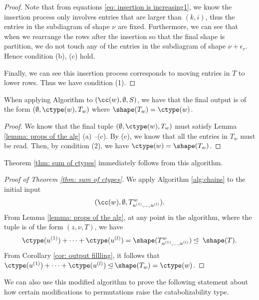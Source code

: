 \begin{proof}
   Note that from equations \eqref{eq: insertion is increasing1}, we know the insertion process only involves entries that are larger than $(k,i)$, thus the entries in the subdiagram of shape $\nu$ are fixed. 
   Furthermore, we can see that when we rearrange the rows after the insertion so that the final shape is partition, we do not touch any of the entries in the subdiagram of shape $\nu+\epsilon_r$. Hence condition (b), (c) hold.

Finally, we can see this insertion process corresponds to moving entries in $T$ to lower rows. Thus we have condition (1).


    \end{proof}

\begin{coro}\label{cor: output fillling}
   When applying Algorithm to $(\cc(w), \emptyset, S)$, we have that the final output is of the form $(\emptyset, \ctype(w), T_w) $ where  $\shape(T_w) = \ctype(w)$.
\end{coro}
\begin{proof}
We know that the final tuple $(\emptyset, \ctype(w), T_w) $ must satisfy Lemma \ref{lemma: props of the alg} (a) --(c).
By (c), we know that all the entries in $T_w$ must be read. Then, by condition (2), we have $\ctype(w) = \shape(T_w)$.
\end{proof}


    
Theorem \ref{thm: sum of ctypes} immediately follows from this algorithm.
\begin{proof}[Proof of Theorem \ref{thm: sum of ctypes}] 
We apply Algorithm \ref{alg:chains} to the initial input \[(\cc(w), \emptyset, T^w_{u^{(1)}, \dots, u^{(l)}}).\]
From Lemma \ref{lemma: props of the alg}, at any point in the algorithm,  where the tuple is of the form $(z,\nu,T)$, we have  \[\ctype(u^{(1)}) + \cdots +\ctype(u^{(l)})  = \shape (T^w_{u^{(1)},\dots,  u^{(l)}}) \unlhd \ \shape(T).\] From Corollary \ref{cor: output fillling}, it follows that $\ctype(u^{(1)}) + \cdots+ \ctype( u^{(l)})\unlhd \shape (T_w) = \ctype(w)$.    
\end{proof}



    We can also use this modified algorithm to prove the following statement about how certain modifications to permutations raise the catabolizability type.
    
